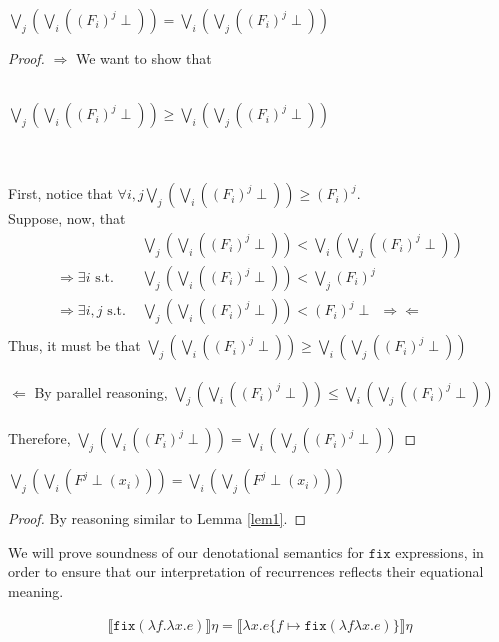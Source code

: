  \begin{lemma} $\bigvee_j(\bigvee_i((F_i)^j \perp))= \bigvee_i(\bigvee_j((F_i)^j \perp))$\\
 \label{lem1}
 \end{lemma}
 \begin{proof}
 $\Rightarrow$ We want to show that\\ \\ \centerline{$\bigvee_j(\bigvee_i((F_i)^j \perp))
  \geq  \bigvee_i(\bigvee_j((F_i)^j \perp))$} \\ \\ First, notice that $\forall i, j \bigvee_j(\bigvee_i
 ((F_i)^j \perp)) \geq (F_i)^j$. \\
 Suppose, now, that 
 \begin{align*}
 &\bigvee_j(\bigvee_i((F_i)^j \perp)) < \bigvee_i(\bigvee_j((F_i)^j \perp))\\ 
 \Rightarrow \exists i \text{ s.t. \ \  \ } &\bigvee_j(\bigvee_i((F_i)^j \perp)) < \bigvee_j (F_i)^j \\
 \Rightarrow \exists i, j \text{ s.t. } &\bigvee_j(\bigvee_i((F_i)^j \perp)) < (F_i)^j \perp  \ \
 \Rightarrow\Leftarrow\\
 \end{align*}
 Thus, it must be that $\bigvee_j(\bigvee_i((F_i)^j \perp)) \geq  \bigvee_i(\bigvee_j((F_i)^j \perp))$ \\ \\
 $\Leftarrow$ By parallel reasoning, $\bigvee_j(\bigvee_i((F_i)^j \perp)) \leq  \bigvee_i(\bigvee_j((F_i)^j  \perp))$ \\ \\
 Therefore, $\bigvee_j(\bigvee_i((F_i)^j \perp)) = \bigvee_i(\bigvee_j((F_i)^j \perp))$ 
 \end{proof}
 \begin{lemma}
 \label{lem2}
 $\bigvee_j(\bigvee_i(F^j \perp(x_i)))= \bigvee_i(\bigvee_j(F^j \perp(x_i)))$\\ 
 \end{lemma}
 \begin{proof} 
 By reasoning similar to Lemma \ref{lem1}. 
 \end{proof}

 We will prove soundness of our denotational semantics for $\texttt{fix}$ expressions, in order to ensure that
 our interpretation of recurrences reflects their equational meaning.
 \begin{thm}
 \begin{align*}
 \llbracket \texttt{fix}(\lambda f. \lambda x.e)\rrbracket \eta = \llbracket \lambda x.e 
 	\{ f \mapsto \texttt{fix}(\lambda f\lambda x.e)\} \rrbracket\eta
 \end{align*}
 \end{thm}
 
